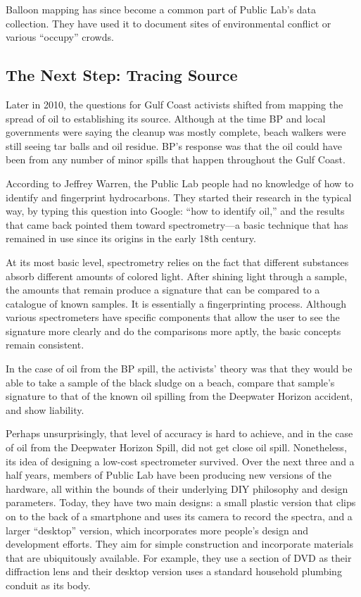 Balloon mapping has since become a common part of Public Lab's data collection.
They have used it to document sites of environmental conflict or
various ``occupy'' crowds.

\subsection{The Next Step: Tracing Source}
Later in 2010, the questions for Gulf Coast activists shifted from mapping
the spread of oil to establishing its source. Although at the time BP and local
governments were saying the cleanup was mostly complete, beach walkers
were still seeing tar balls and oil residue. BP's response was that the oil
could have been from any number of minor spills that happen throughout
the Gulf Coast.

According to Jeffrey Warren, the Public Lab people had no knowledge of
how to identify and fingerprint hydrocarbons. They started their research
in the typical way, by typing this question into Google: ``how to identify
oil,'' and the results that came back pointed them toward spectrometry—a
basic technique that has remained in use since its origins in the early 18th
century.

At its most basic level, spectrometry relies on the fact that different substances
absorb different amounts of colored light. After shining light
through a sample, the amounts that remain produce a signature that can be
compared to a catalogue of known samples. It is essentially a fingerprinting
process. Although various spectrometers have specific components that
allow the user to see the signature more clearly and do the comparisons
more aptly, the basic concepts remain consistent.

In the case of oil from the BP spill, the activists' theory was that they would
be able to take a sample of the black sludge on a beach, compare that sample's
signature to that of the known oil spilling from the Deepwater Horizon
accident, and show liability.

Perhaps unsurprisingly, that level of accuracy is hard to achieve, and in the
case of oil from the Deepwater Horizon Spill, did not get close oil spill.
Nonetheless, its idea of designing a low-cost spectrometer survived. Over
the next three and a half years, members of Public Lab have been producing
new versions of the hardware, all within the bounds of their underlying
DIY philosophy and design parameters. Today, they have two main designs: a small plastic version that clips on to the back of a smartphone and uses its
camera to record the spectra, and a larger ``desktop'' version, which incorporates
more people's design and development efforts. They aim for simple
construction and incorporate materials that are ubiquitously available. For
example, they use a section of DVD as their diffraction lens and their desktop
version uses a standard household plumbing conduit as its body.

